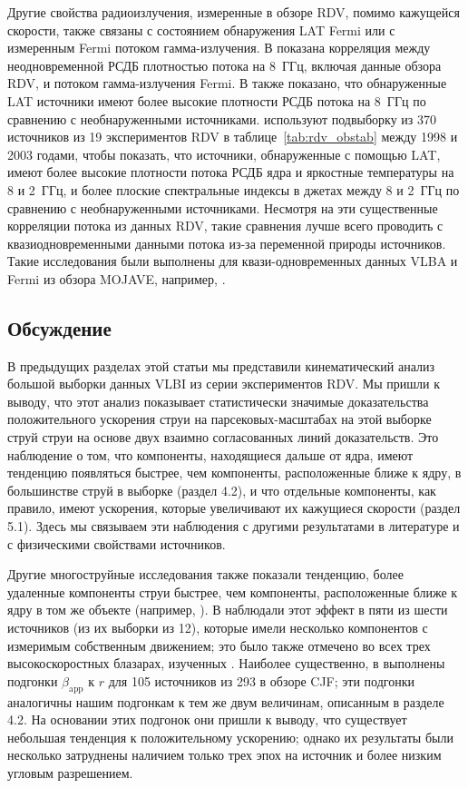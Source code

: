 Другие свойства радиоизлучения, измеренные в обзоре RDV, помимо кажущейся скорости, также связаны с
состоянием обнаружения LAT Fermi или с измеренным Fermi потоком гамма-излучения. В
\cite{Kovalev_2009a} показана корреляция между неодновременной РСДБ плотностью потока на 8~ГГц,
включая данные обзора RDV, и потоком гамма-излучения Fermi. В \cite{Kovalev_2009a} также показано,
что обнаруженные LAT источники имеют более высокие плотности РСДБ потока на 8~ГГц по сравнению с
необнаруженными источниками. \cite{Pushkarev_2012b} используют подвыборку из 370 источников из 19
экспериментов RDV в таблице~\ref{tab:rdv_obstab} между 1998 и 2003 годами, чтобы показать, что
источники, обнаруженные с помощью LAT, имеют более высокие плотности потока РСДБ ядра и яркостные
температуры на 8 и 2~ГГц, и более плоские спектральные индексы в джетах между 8 и 2~ГГц по сравнению
с необнаруженными источниками. Несмотря на эти существенные корреляции потока из данных RDV, такие
сравнения лучше всего проводить с квазиодновременными данными потока из-за переменной природы
источников. Такие исследования были выполнены для квази-одновременных данных VLBA и Fermi из обзора
MOJAVE, например, \cite{Kovalev_2009b,Pushkarev_2010,Lister_2011}.

\subsection{Обсуждение}

В предыдущих разделах этой статьи мы представили кинематический анализ большой выборки данных VLBI
из серии экспериментов RDV. Мы пришли к выводу, что этот анализ показывает статистически значимые
доказательства положительного ускорения струи на парсековых-масштабах на этой выборке струй
струи на основе двух взаимно согласованных линий доказательств. Это наблюдение о том, что
компоненты, находящиеся дальше от ядра, имеют тенденцию появляться быстрее, чем компоненты,
расположенные ближе к ядру, в большинстве струй в выборке (раздел 4.2), и что отдельные компоненты,
как правило, имеют ускорения, которые увеличивают их кажущиеся скорости (раздел 5.1). Здесь мы
связываем эти наблюдения с другими результатами в литературе и с физическими свойствами источников.

Другие многоструйные исследования также показали тенденцию, более удаленные компоненты
струи быстрее, чем компоненты, расположенные ближе к ядру в том же объекте (например,
\cite{Homan_2001,Piner_2006,Britzen_2008}). В \cite{Homan_2001} наблюдали этот эффект в пяти из
шести источников (из их выборки из 12), которые имели несколько компонентов с измеримым собственным
движением; это было также отмечено во всех трех высокоскоростных блазарах, изученных
\cite{Piner_2006}. Наиболее существенно, в \cite{Britzen_2008} выполнены подгонки
$\beta_\text{app}$ к $r$ для 105 источников из 293 в обзоре CJF; эти подгонки аналогичны нашим
подгонкам к тем же двум величинам, описанным в разделе 4.2. На основании этих подгонок они пришли к
выводу, что существует небольшая тенденция к положительному ускорению; однако их результаты были
несколько затруднены наличием только трех эпох на источник и более низким угловым разрешением.

